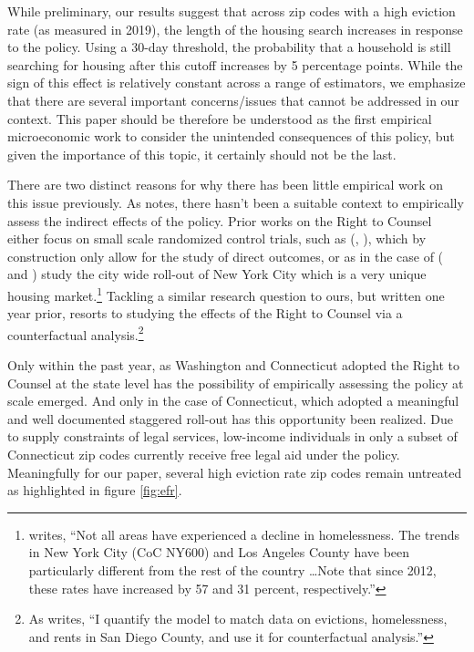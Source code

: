 \documentclass[a4paper,12pt]{article}
\begin{document}
While preliminary, our results suggest that across zip codes with a high eviction rate (as measured in 2019), the length of the housing search increases in response to the policy. Using a 30-day threshold, the probability that a household is still searching for housing after this cutoff increases by 5 percentage points. While the sign of this effect is relatively constant across a range of estimators, we emphasize that there are several important concerns/issues that cannot be addressed in our context. This paper should be therefore be understood as the first empirical microeconomic work to consider the unintended consequences of this policy, but given the importance of this topic, it certainly should not be the last.

There are two distinct reasons for why there has been little empirical work on this issue previously. As \cite{abramson2021welfare} notes, there hasn't been a suitable context to empirically assess the indirect effects of the policy. Prior works on the Right to Counsel either focus on small scale randomized control trials, such as (\cite{greiner2012limits}, \cite{seron2001impact}), which by construction only allow for the study of direct outcomes, or as in the case of (\cite{cassidy2022effects} and \cite{ellen2021lawyers}) study the city wide roll-out of New York City which is a very unique housing market.\footnote{\cite{evans2019reducing} writes, ``Not all areas have experienced a decline in homelessness. The trends in New York City (CoC NY600) and Los Angeles County have been particularly different from the rest of the country \dots Note that since 2012, these rates have increased by 57 and 31 percent, respectively.''} Tackling a similar research question to ours, but written one year prior,  \cite{abramson2021welfare} resorts to studying the effects of the Right to Counsel via a counterfactual analysis.\footnote{As \cite{abramson2021welfare} writes, ``I quantify the model to match data on evictions, homelessness, and rents in San Diego
County, and use it for counterfactual analysis.''}\par Only within the past year, as Washington and Connecticut adopted the Right to Counsel at the state level has the possibility of empirically assessing the policy at scale emerged. And only in the case of Connecticut, which adopted a meaningful and well documented staggered roll-out has this opportunity been realized. Due to supply constraints of legal services, low-income individuals in only a subset of Connecticut zip codes currently receive free legal aid under the policy. Meaningfully for our paper, several high eviction rate zip codes remain untreated as highlighted in figure \ref{fig:efr}.\par 
\end{document}

